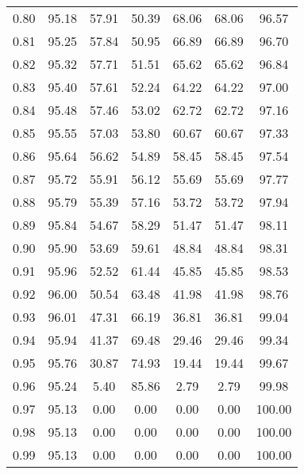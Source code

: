 \begin{tabular}{|c|c|c|c|c|c|c|}
      0.80 &     95.18 &     57.91 &      50.39 &   68.06 &      68.06 &         96.57 \\
      0.81 &     95.25 &     57.84 &      50.95 &   66.89 &      66.89 &         96.70 \\
      0.82 &     95.32 &     57.71 &      51.51 &   65.62 &      65.62 &         96.84 \\
      0.83 &     95.40 &     57.61 &      52.24 &   64.22 &      64.22 &         97.00 \\
      0.84 &     95.48 &     57.46 &      53.02 &   62.72 &      62.72 &         97.16 \\
      0.85 &     95.55 &     57.03 &      53.80 &   60.67 &      60.67 &         97.33 \\
      0.86 &     95.64 &     56.62 &      54.89 &   58.45 &      58.45 &         97.54 \\
      0.87 &     95.72 &     55.91 &      56.12 &   55.69 &      55.69 &         97.77 \\
      0.88 &     95.79 &     55.39 &      57.16 &   53.72 &      53.72 &         97.94 \\
      0.89 &     95.84 &     54.67 &      58.29 &   51.47 &      51.47 &         98.11 \\
      0.90 &     95.90 &     53.69 &      59.61 &   48.84 &      48.84 &         98.31 \\
      0.91 &     95.96 &     52.52 &      61.44 &   45.85 &      45.85 &         98.53 \\
      0.92 &     96.00 &     50.54 &      63.48 &   41.98 &      41.98 &         98.76 \\
      0.93 &     96.01 &     47.31 &      66.19 &   36.81 &      36.81 &         99.04 \\
      0.94 &     95.94 &     41.37 &      69.48 &   29.46 &      29.46 &         99.34 \\
      0.95 &     95.76 &     30.87 &      74.93 &   19.44 &      19.44 &         99.67 \\
      0.96 &     95.24 &      5.40 &      85.86 &    2.79 &       2.79 &         99.98 \\
      0.97 &     95.13 &      0.00 &       0.00 &    0.00 &       0.00 &        100.00 \\
      0.98 &     95.13 &      0.00 &       0.00 &    0.00 &       0.00 &        100.00 \\
      0.99 &     95.13 &      0.00 &       0.00 &    0.00 &       0.00 &        100.00 \\
\bottomrule
\end{tabular}
